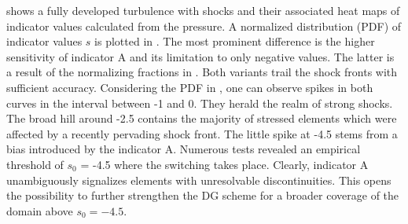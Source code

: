  shows a fully developed turbulence with shocks and
their associated heat maps of indicator values calculated from the pressure.  A
normalized distribution (PDF) of indicator values $s$ is plotted in
.  The most prominent difference is the higher
sensitivity of indicator A and its limitation to only negative values. The
latter is a result of the normalizing fractions in . Both
variants trail the shock fronts with sufficient accuracy. Considering the PDF
in , one can observe spikes in both curves in the
interval between -1 and 0. They herald the realm of strong shocks. The broad
hill around -2.5 contains the majority of stressed elements which were affected
by a recently pervading shock front.  The little spike at -4.5 stems from a
bias introduced by the indicator A. Numerous tests revealed an empirical
threshold of $s_0$ = -4.5 where the switching takes place. Clearly, indicator A
unambiguously signalizes elements with unresolvable discontinuities. This opens
the possibility to further strengthen the DG scheme for a broader coverage of
the domain above $s_0 = -4.5$.
